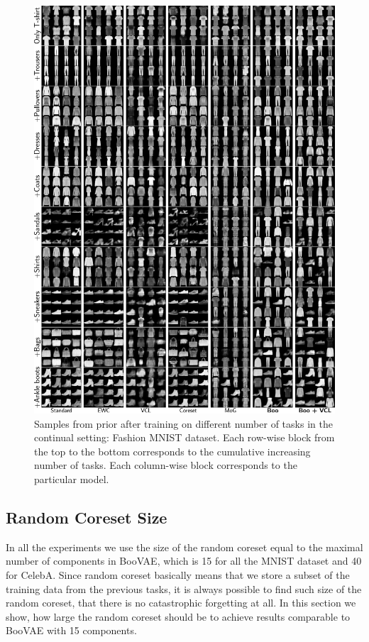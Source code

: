 \begin{figure}[ht]
		\centering
		\includegraphics[width=\textwidth]{pics/1_boovae/FashionMNIST_full.pdf}
		\caption{Samples from prior after training on different number of tasks  in the continual setting: Fashion MNIST dataset. Each row-wise block from the top to the bottom corresponds to the cumulative increasing number of tasks. Each column-wise block corresponds to the particular model.}
		\label{fig:fMNIST_gen}
\end{figure}

\clearpage
\subsection{Random Coreset Size}\label{app:coreset}

In all the experiments we use the size of the random coreset equal to the maximal number of components in BooVAE, which is 15 for all the MNIST dataset and 40 for CelebA. Since random coreset basically means that we store a subset of the training data from the previous tasks, it is always possible to find such size of the random coreset, that there is no catastrophic forgetting at all. In this section we show, how large the random coreset should be to achieve results comparable to BooVAE with 15 components. 


